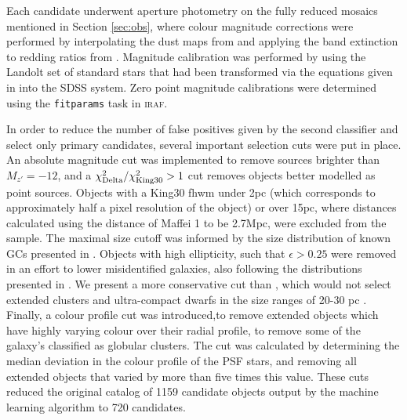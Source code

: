 \documentclass[useAMS,usenatbib]{mn2e}
\begin{document}
Each candidate underwent aperture photometry on the fully reduced mosaics mentioned in Section \ref{sec:obs}, where colour magnitude corrections were performed by interpolating the dust maps from \citet{Schlegel1998} and applying the band extinction to redding ratios from \citet{Schlafly2011}. Magnitude calibration was performed by using the Landolt set of standard stars \citep{Landolt1992} that had been transformed via the equations given in \citet{Fukugita1996} into the SDSS system. Zero point magnitude calibrations were determined using the \verb|fitparams| task in \textsc{iraf}.




In order to reduce the number of false positives given by the second classifier and select only primary candidates, several important selection cuts were put in place. An absolute magnitude cut was implemented to remove sources brighter than $M_{z'} = -12$, and a $\chi^2_{\rm{Delta}}/\chi^2_{\rm{King30}} >1$ cut removes objects better modelled as point sources. Objects with a King30 fhwm under 2pc (which corresponds to approximately half a pixel resolution of the object) or over 15pc, where distances calculated using the distance of Maffei 1 to be 2.7Mpc, were excluded from the sample. The maximal size cutoff was informed by the size distribution of known GCs presented in \citet{Harris2012}. Objects with high ellipticity, such that $\epsilon > 0.25$ were removed in an effort to lower misidentified galaxies, also following the distributions presented in \citet{Harris2012}. We present a more conservative cut than \citet{Harris2012}, which would not select extended clusters and ultra-compact dwarfs in the size ranges of 20-30 pc \citep{Evstigneeva2008,Huxor2005}. Finally, a colour profile cut was introduced,to remove extended objects which have highly varying colour over their radial profile, to remove some of the galaxy's classified as globular clusters. The cut was calculated by determining the median deviation in the colour profile of the PSF stars, and removing all extended objects that varied by more than five times this value. These cuts reduced the original catalog of 1159 candidate objects output by the machine learning algorithm to 720 candidates.
\end{document}
